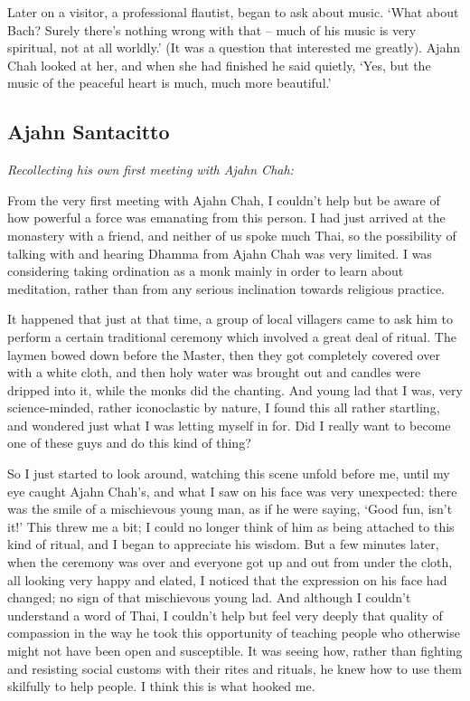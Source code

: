 Later on a visitor, a professional flautist, began to ask about music.
`What about Bach? Surely there's nothing wrong with that -- much of his
music is very spiritual, not at all worldly.' (It was a question that
interested me greatly). Ajahn Chah looked at her, and when she had
finished he said quietly, `Yes, but the music of the peaceful heart is
much, much more beautiful.'

\subsection{Ajahn Santacitto}

\emph{Recollecting his own first meeting with Ajahn Chah:}

From the very first meeting with Ajahn Chah, I couldn't help but be
aware of how powerful a force was emanating from this person. I had just
arrived at the monastery with a friend, and neither of us spoke much
Thai, so the possibility of talking with and hearing Dhamma from Ajahn
Chah was very limited. I was considering taking ordination as a monk
mainly in order to learn about meditation, rather than from any serious
inclination towards religious practice. 

It happened that just at that time, a group of local villagers came to
ask him to perform a certain traditional ceremony which involved a great
deal of ritual. The laymen bowed down before the Master, then they got
completely covered over with a white cloth, and then holy water was
brought out and candles were dripped into it, while the monks did the
chanting. And young lad that I was, very science-minded, rather
iconoclastic by nature, I found this all rather startling, and wondered
just what I was letting myself in for. Did I really want to become one
of these guys and do this kind of thing? 

So I just started to look around, watching this scene unfold before me, 
until my eye caught Ajahn Chah's, and what I saw on his face was very
unexpected: there was the smile of a mischievous young man, as if he
were saying, `Good fun, isn't it!' This threw me a bit; I could no
longer think of him as being attached to this kind of ritual, and I
began to appreciate his wisdom. But a few minutes later, when the
ceremony was over and everyone got up and out from under the cloth, all
looking very happy and elated, I noticed that the expression on his face
had changed; no sign of that mischievous young lad. And although I
couldn't understand a word of Thai, I couldn't help but feel very deeply
that quality of compassion in the way he took this opportunity of
teaching people who otherwise might not have been open and susceptible. 
It was seeing how, rather than fighting and resisting social customs
with their rites and rituals, he knew how to use them skilfully to help
people. I think this is what hooked me. 

